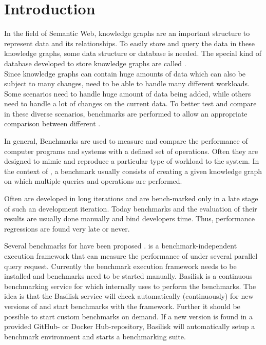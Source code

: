 \chapter{Introduction}
\label{ch:introduction}




In the field of Semantic Web, knowledge graphs are an important structure to represent data and its relationships.
To easily store and query the data in these knowledge graphs, some data structure or database is needed.
The special kind of database developed to store knowledge graphs are called \tsp{}. \\

Since knowledge graphs can contain huge amounts of data which can also be subject to many changes, \tsp{} need to be able to handle many different workloads.
Some scenarios need to handle huge amount of data being added, while others need to handle a lot of changes on the current data.
To better test and compare \tsp{} in these diverse scenarios, benchmarks are performed to allow an appropriate comparison between different \tsp{}\cite{saleemHowRepresentativeSPARQL2019}.

In general, Benchmarks are used to measure and compare the performance of computer programs and systems with a defined set of operations.
Often they are designed to mimic and reproduce a particular type of workload to the system.
In the context of \tsp{}, a benchmark usually consists of creating a given knowledge graph on which multiple queries and operations are performed.

Often \tsp{} are developed in long iterations and are bench-marked only in a late stage of such an development iteration.
Today benchmarks and the evaluation of their results are usually done manually and bind developers time.
Thus, performance regressions are  found very late or never.


Several benchmarks for \tsp{} have been proposed \cite{saleemHowRepresentativeSPARQL2019}.
\iguana{} is a benchmark-independent execution framework \cite{conradsIguanaGenericFramework2017} that can measure the performance of \tsp{} under several parallel query request.
Currently the benchmark execution framework needs to be installed and benchmarks need to be started manually.
Basilisk is a continuous benchmarking service for \tsp{} which internally uses \iguana{} to perform the benchmarks.
The idea is that the Basilisk service will check automatically (continuously) for new versions of \tsp{} and start benchmarks with the \iguana{} framework.
Further it should be possible to start custom benchmarks on demand.
If a new version is found in a provided GitHub- or Docker Hub-repository, Basilisk will automatically setup a benchmark environment and starts a benchmarking suite.


